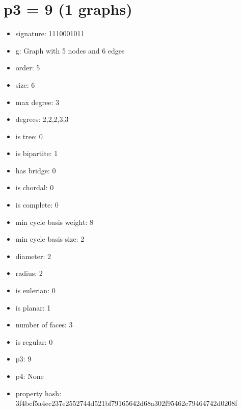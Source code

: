 \chapter{p3 = 9 (1 graphs)}
\newpage\begin{figure}
\end{figure}
\begin{itemize}
\item signature: 1110001011
\item g: Graph with 5 nodes and 6 edges
\item order: 5
\item size: 6
\item max degree: 3
\item degrees: 2,2,2,3,3
\item is tree: 0
\item is bipartite: 1
\item has bridge: 0
\item is chordal: 0
\item is complete: 0
\item min cycle basis weight: 8
\item min cycle basis size: 2
\item diameter: 2
\item radius: 2
\item is eulerian: 0
\item is planar: 1
\item number of faces: 3
\item is regular: 0
\item p3: 9
\item p4: None
\item property hash: 3f4bcf5a4ec237e2552744d521bf79165642d68a302f95462c79464742d0208f
\end{itemize}
\newpage
